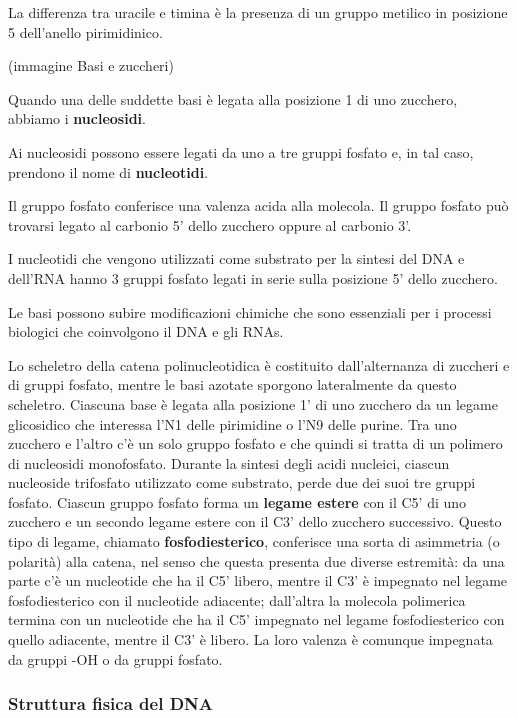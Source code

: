 \documentclass[]{article}
\begin{document}
La differenza tra uracile e timina è la presenza di un gruppo metilico
in posizione 5 dell'anello pirimidinico.

(immagine Basi e zuccheri)

Quando una delle suddette basi è legata alla posizione 1 di uno
zucchero, abbiamo i \textbf{nucleosidi}.

Ai nucleosidi possono essere legati da uno a tre gruppi fosfato e, in
tal caso, prendono il nome di \textbf{nucleotidi}.

Il gruppo fosfato conferisce una valenza acida alla molecola. Il gruppo
fosfato può trovarsi legato al carbonio 5' dello zucchero oppure al
carbonio 3'.

I nucleotidi che vengono utilizzati come substrato per la sintesi del
DNA e dell'RNA hanno 3 gruppi fosfato legati in serie sulla posizione 5'
dello zucchero.

Le basi possono subire modificazioni chimiche che sono essenziali per i
processi biologici che coinvolgono il DNA e gli RNAs.

Lo scheletro della catena polinucleotidica è costituito dall'alternanza
di zuccheri e di gruppi fosfato, mentre le basi azotate sporgono
lateralmente da questo scheletro. Ciascuna base è legata alla posizione
1' di uno zucchero da un legame glicosidico che interessa l'N1 delle
pirimidine o l'N9 delle purine. Tra uno zucchero e l'altro c'è un solo
gruppo fosfato e che quindi si tratta di un polimero di nucleosidi
monofosfato. Durante la sintesi degli acidi nucleici, ciascun nucleoside
trifosfato utilizzato come substrato, perde due dei suoi tre gruppi
fosfato. Ciascun gruppo fosfato forma un \textbf{legame estere} con il
C5' di uno zucchero e un secondo legame estere con il C3' dello zucchero
successivo. Questo tipo di legame, chiamato \textbf{fosfodiesterico},
conferisce una sorta di asimmetria (o polarità) alla catena, nel senso
che questa presenta due diverse estremità: da una parte c'è un
nucleotide che ha il C5' libero, mentre il C3' è impegnato nel legame
fosfodiesterico con il nucleotide adiacente; dall'altra la molecola
polimerica termina con un nucleotide che ha il C5' impegnato nel legame
fosfodiesterico con quello adiacente, mentre il C3' è libero. La loro
valenza è comunque impegnata da gruppi -OH o da gruppi fosfato.

\subsubsection{Struttura fisica del DNA}\label{struttura-fisica-del-dna}
\end{document}
